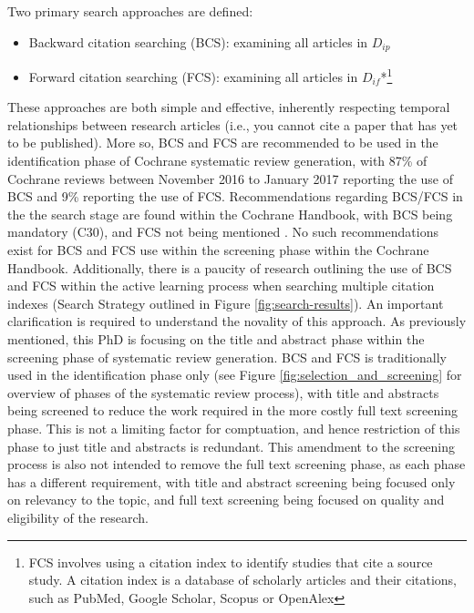 \documentclass[../main.tex]{subfiles}
\begin{document}
Two primary search approaches are defined:
\begin{itemize}
    \item Backward citation searching (BCS): examining all articles in $D_{ip}$\cite{lefebvre2011cochrane, akers2009systematic}
    \item Forward citation searching (FCS): examining all articles in $D_{if}$*\footnote{FCS involves using a citation index to identify studies that cite a source study. A citation index is a database of scholarly articles and their citations, such as PubMed, Google Scholar, Scopus or OpenAlex}
\end{itemize}

These approaches are both simple and effective, inherently respecting temporal relationships between research articles (i.e., you cannot cite a paper that has yet to be published). More so, BCS and FCS are recommended to be used in the identification phase of Cochrane systematic review generation, with 87\% of Cochrane reviews between November 2016 to January 2017 reporting the use of BCS and 9\% reporting the use of FCS\cite{briscoeConductReportingCitation2019}. Recommendations regarding BCS/FCS in the the search stage are found within the Cochrane Handbook, with BCS being mandatory (C30), and FCS not being mentioned \cite{MECIRManualCochrane}. No such recommendations exist for BCS and FCS use within the screening phase within the Cochrane Handbook. 
Additionally, there is a paucity of research outlining the use of BCS and FCS within the active learning process when searching multiple citation indexes (Search Strategy outlined in Figure \ref{fig:search-results}). An important clarification is required to understand the novality of this approach. As previously mentioned, this PhD is focusing on the title and abstract phase within the screening phase of systematic review generation. BCS and FCS is traditionally used in the identification phase only (see Figure \ref{fig:selection_and_screening} for overview of phases of the systematic review process), with title and abstracts being screened to reduce the work required in the more costly full text screening phase. This is not a limiting factor for comptuation, and hence restriction of this phase to just title and abstracts is redundant. This amendment to the screening process is also not intended to remove the full text screening phase, as each phase has a different requirement, with title and abstract screening being focused only on relevancy to the topic, and full text screening being focused on quality and eligibility of the research.
\end{document}
